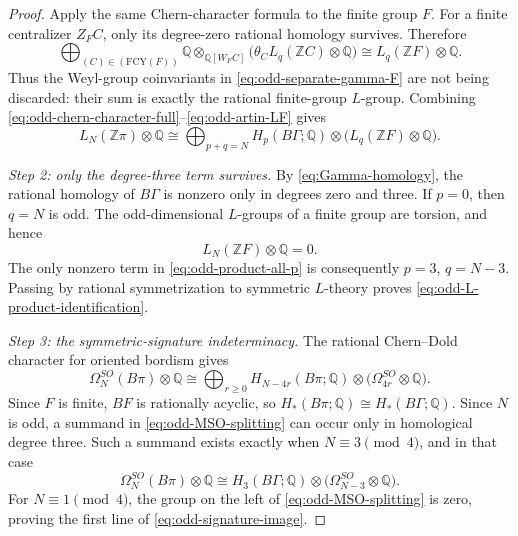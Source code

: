 \documentclass[10pt,reqno]{amsart}
\numberwithin{equation}{section}
\theoremstyle{definition}
\theoremstyle{remark}
\newcommand{\Z}{\mathbb Z}
\newcommand{\Q}{\mathbb Q}
\begin{document}
\begin{proof}
Apply the same Chern-character formula to the finite group \(F\).
For a finite centralizer \(Z_FC\), only its degree-zero rational
homology survives.  Therefore
\begin{equation}\label{eq:odd-artin-LF}
\bigoplus_{(C)\in(\mathrm{FCY}(F))}
\Q\otimes_{\Q[W_FC]}
\bigl(\theta_C L_q(\Z C)\otimes\Q\bigr)
\cong L_q(\Z F)\otimes\Q.
\end{equation}
Thus the Weyl-group coinvariants in
\eqref{eq:odd-separate-gamma-F} are not being discarded: their sum is
exactly the rational finite-group \(L\)-group.  Combining
\eqref{eq:odd-chern-character-full}--\eqref{eq:odd-artin-LF} gives
\begin{equation}\label{eq:odd-product-all-p}
L_N(\Z\pi)\otimes\Q
\cong
\bigoplus_{p+q=N}
H_p(B\Gamma;\Q)\otimes
\bigl(L_q(\Z F)\otimes\Q\bigr).
\end{equation}

\smallskip
\noindent
\emph{Step 2: only the degree-three term survives.}
By \eqref{eq:Gamma-homology}, the rational homology of \(B\Gamma\)
is nonzero only in degrees zero and three.  If \(p=0\), then
\(q=N\) is odd.  The odd-dimensional \(L\)-groups of a finite group
are torsion, and hence
\[
L_N(\Z F)\otimes\Q=0.
\]
The only nonzero term in \eqref{eq:odd-product-all-p} is consequently
\(p=3\), \(q=N-3\).  Passing by rational symmetrization to symmetric
\(L\)-theory proves \eqref{eq:odd-L-product-identification}.

\smallskip
\noindent
\emph{Step 3: the symmetric-signature indeterminacy.}
The rational Chern--Dold character for oriented bordism gives
\begin{equation}\label{eq:odd-MSO-splitting}
\Omega_N^{SO}(B\pi)\otimes\Q
\cong
\bigoplus_{r\geq0}
H_{N-4r}(B\pi;\Q)
\otimes
\bigl(\Omega_{4r}^{SO}\otimes\Q\bigr).
\end{equation}
Since \(F\) is finite, \(BF\) is rationally acyclic, so
\(H_*(B\pi;\Q)\cong H_*(B\Gamma;\Q)\).  Since \(N\) is odd, a
summand in \eqref{eq:odd-MSO-splitting} can occur only in homological
degree three.  Such a summand exists exactly when \(N\equiv3\pmod4\),
and in that case
\begin{equation}\label{eq:odd-MSO-degree-three}
\Omega_N^{SO}(B\pi)\otimes\Q
\cong
H_3(B\Gamma;\Q)
\otimes
\bigl(\Omega_{N-3}^{SO}\otimes\Q\bigr).
\end{equation}
For \(N\equiv1\pmod4\), the group on the left of
\eqref{eq:odd-MSO-splitting} is zero, proving the first line of
\eqref{eq:odd-signature-image}.


\end{proof}
\end{document}
